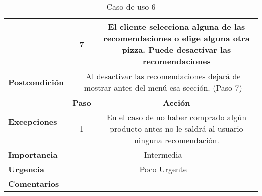\documentclass[conference]{IEEEtran}
\begin{document}
\begin{table}[H]
\begin{adjustbox}{width=0.45\textwidth}
\begin{tabular}{|p{11.215em}|c|c|}
\cmidrule{2-3}    \multicolumn{1}{|c|}{} & 7     & \multicolumn{1}{p{32em}|}{El cliente selecciona alguna de las recomendaciones o elige alguna otra pizza. Puede desactivar las recomendaciones} \\
    \midrule
    \textbf{Postcondición} & \multicolumn{2}{p{37.355em}|}{Al desactivar las recomendaciones dejará de mostrar antes del menú esa sección. (Paso 7)} \\
    \midrule
    \multirow{3}[4]{*}{\textbf{Excepciones}} & \multicolumn{1}{p{5.355em}|}{\textbf{Paso}} & \multicolumn{1}{p{32em}|}{\textbf{Acción}} \\
\cmidrule{2-3}    \multicolumn{1}{|c|}{} & \multirow{2}[2]{*}{1} & \multicolumn{1}{c|}{\multirow{2}[2]{*}{En el caso de no haber comprado algún producto antes no le saldrá al usuario ninguna recomendación.}} \\
    \multicolumn{1}{|c|}{} &       &  \\
    \midrule
    \textbf{Importancia} & \multicolumn{2}{p{37.355em}|}{Intermedia} \\
    \midrule
    \textbf{Urgencia} & \multicolumn{2}{p{37.355em}|}{Poco Urgente} \\
    \midrule
    \textbf{Comentarios} & \multicolumn{2}{c|}{} \\
    \bottomrule
    \end{tabular}%
    \end{adjustbox}
    \vspace{0.2cm}
    \caption{Caso de uso 6}
  \label{tab:addlabel}%
\end{table}%
\end{document}
